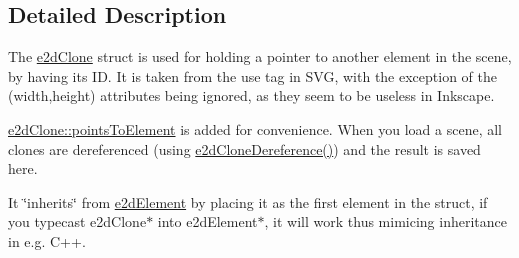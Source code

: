 \subsection{Detailed Description}
The \hyperlink{structe2dClone}{e2d\-Clone} struct is used for holding a pointer to another element in the scene, by having its I\-D. It is taken from the use tag in S\-V\-G, with the exception of the (width,height) attributes being ignored, as they seem to be useless in Inkscape. 

\hyperlink{structe2dClone_a237249b3b105a04b15b87304bba704a2}{e2d\-Clone\-::points\-To\-Element} is added for convenience. When you load a scene, all clones are dereferenced (using \hyperlink{group__e2dClone_ga7a2d3abbe249ab9c4a402d31ef0b9275}{e2d\-Clone\-Dereference()}) and the result is saved here.

It \char`\"{}inherits\char`\"{} from \hyperlink{structe2dElement}{e2d\-Element} by placing it as the first element in the struct, if you typecast e2d\-Clone$\ast$ into e2d\-Element$\ast$, it will work thus mimicing inheritance in e.\-g. C++. 

